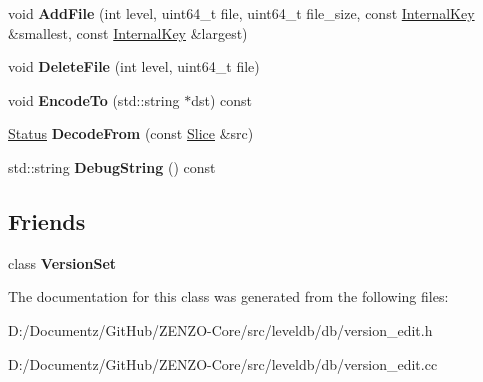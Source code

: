 \begin{DoxyCompactItemize}
void {\bfseries Add\+File} (int level, uint64\+\_\+t file, uint64\+\_\+t file\+\_\+size, const \mbox{\hyperlink{classleveldb_1_1_internal_key}{Internal\+Key}} \&smallest, const \mbox{\hyperlink{classleveldb_1_1_internal_key}{Internal\+Key}} \&largest)
\item 
\mbox{\label{classleveldb_1_1_version_edit_ac222bfd1055114d57aadbd124f24ad0c}} 
void {\bfseries Delete\+File} (int level, uint64\+\_\+t file)
\item 
\mbox{\label{classleveldb_1_1_version_edit_af95009ddc020f72a32a1aa805bcf3a91}} 
void {\bfseries Encode\+To} (std\+::string $\ast$dst) const
\item 
\mbox{\label{classleveldb_1_1_version_edit_ac0f431c5e8f08c74c697d8480f7c005f}} 
\mbox{\hyperlink{classleveldb_1_1_status}{Status}} {\bfseries Decode\+From} (const \mbox{\hyperlink{classleveldb_1_1_slice}{Slice}} \&src)
\item 
\mbox{\label{classleveldb_1_1_version_edit_a535f639edaa85da0d602b145528c6303}} 
std\+::string {\bfseries Debug\+String} () const
\end{DoxyCompactItemize}
\subsection*{Friends}
\begin{DoxyCompactItemize}
\item 
\mbox{\label{classleveldb_1_1_version_edit_a1827cd1b4d6e9e3c378ce37ca3cce635}} 
class {\bfseries Version\+Set}
\end{DoxyCompactItemize}


The documentation for this class was generated from the following files\+:\begin{DoxyCompactItemize}
\item 
D\+:/\+Documentz/\+Git\+Hub/\+Z\+E\+N\+Z\+O-\/\+Core/src/leveldb/db/version\+\_\+edit.\+h\item 
D\+:/\+Documentz/\+Git\+Hub/\+Z\+E\+N\+Z\+O-\/\+Core/src/leveldb/db/version\+\_\+edit.\+cc\end{DoxyCompactItemize}
